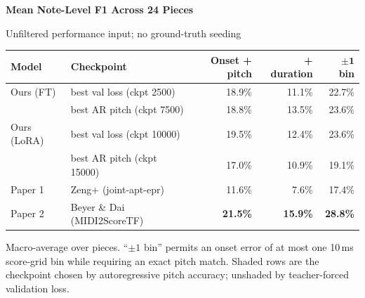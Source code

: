 \documentclass[border=14pt]{standalone}
\begin{document}
\begin{minipage}{15.4cm}
  \centering
  {\Large\bfseries Mean Note-Level F1 Across 24 Pieces\par}
  \vspace{3pt}
  {\small\color{muted}Unfiltered performance input; no ground-truth seeding\par}
  \vspace{10pt}

  \renewcommand{\arraystretch}{1.35}
  \setlength{\tabcolsep}{12pt}
  \begin{tabular}{>{\raggedright\arraybackslash}p{2.5cm}
                  >{\raggedright\arraybackslash}p{4.5cm} r r r}
    \arrayrulecolor{ruleblue}
    \toprule
    \rowcolor{headerblue}
    \textbf{Model} &
    \textbf{Checkpoint} &
    \textbf{Onset + pitch} &
    \textbf{+ duration} &
    \textbf{$\boldsymbol{\pm 1}$ bin} \\
    \midrule
    Ours (FT)   & best val loss \textcolor{muted}{(ckpt 2500)}   & 18.9\% & 11.1\% & 22.7\% \\
    \rowcolor{bandgrey}
                & best AR pitch \textcolor{muted}{(ckpt 7500)}   & 18.8\% & 13.5\% & 23.6\% \\
    Ours (LoRA) & best val loss \textcolor{muted}{(ckpt 10000)}  & 19.5\% & 12.4\% & 23.6\% \\
    \rowcolor{bandgrey}
                & best AR pitch \textcolor{muted}{(ckpt 15000)}  & 17.0\% & 10.9\% & 19.1\% \\
    Paper 1     & Zeng+ \textcolor{muted}{(joint-apt-epr)}                                 & 11.6\% &  7.6\% & 17.4\% \\
    Paper 2     & Beyer \& Dai \textcolor{muted}{(MIDI2ScoreTF)}                                        & \textbf{21.5\%} & \textbf{15.9\%} & \textbf{28.8\%} \\
    \bottomrule
  \end{tabular}

  \vspace{8pt}
  {\footnotesize\color{muted}
    Macro-average over pieces. ``$\pm 1$ bin'' permits an onset error of at most
    one 10\,ms score-grid bin while requiring an exact pitch match.
    Shaded rows are the checkpoint chosen by autoregressive pitch accuracy;
    unshaded by teacher-forced validation loss.\par}
\end{minipage}
\end{document}
